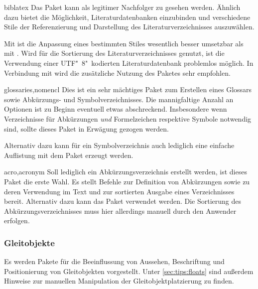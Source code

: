 \begin{packages}
\item[biblatex]
  Das Paket kann als legitimer Nachfolger zu  gesehen werden. 
  Ähnlich dazu bietet  die Möglichkeit, Literaturdatenbanken 
  einzubinden und verschiedene Stile der Referenzierung und Darstellung des 
  Literaturverzeichnisses auszuwählen. 
  
  Mit  ist die Anpassung eines bestimmten Stiles wesentlich 
  besser umsetzbar als mit . Wird  für die 
  Sortierung des Literaturverzeichnisses genutzt, ist die Verwendung einer 
  UTF"~8"~kodierten Literaturdatenbank problemlos möglich. In Verbindung mit 
   wird die zusätzliche Nutzung des Paketes 
   sehr empfohlen.
\item[glossaries,nomencl]
  Dies ist ein sehr mächtiges Paket zum Erstellen eines Glossars sowie 
  Abkürzungs- und Symbolverzeichnisses. Die mannigfaltige Anzahl an Optionen 
  ist zu Beginn eventuell etwas abschreckend. Insbesondere wenn Verzeichnisse 
  für Abkürzungen \emph{und} Formelzeichen respektive Symbole notwendig sind, 
  sollte dieses Paket in Erwägung gezogen werden.
  
  Alternativ dazu kann für ein Symbolverzeichnis auch lediglich eine einfache 
  Auflistung mit dem Paket  erzeugt werden.
\item[acro,acronym]
  Soll lediglich ein Abkürzungsverzeichnis erstellt werden, ist dieses Paket 
  die erste Wahl. Es stellt Befehle zur Definition von Abkürzungen sowie zu 
  deren Verwendung im Text und zur sortierten Ausgabe eines Verzeichnisses 
  bereit. Alternativ dazu kann das Paket  verwendet werden. 
  Die Sortierung des Abkürzungsverzeichnisses muss hier allerdings manuell 
  durch den Anwender erfolgen.
\end{packages}
%



\subsubsection{%
  Gleitobjekte%
}
Es werden Pakete für die Beeinflussung von Aussehen, Beschriftung und 
Positionierung von Gleitobjekten vorgestellt. Unter \autoref{sec:tips:floats} 
sind außerdem Hinweise zur manuellen Manipulation der Gleitobjektplatzierung zu 
finden.

